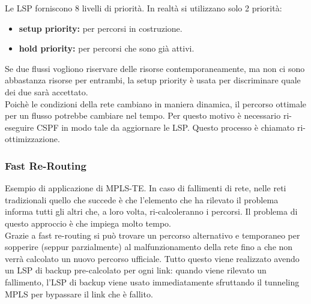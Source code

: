 \documentclass{article}
\begin{document}
Le LSP forniscono 8 livelli di priorità. In realtà si utilizzano solo 2 priorità:
\begin{itemize}
    \item \textbf{setup priority:} per percorsi in costruzione.
    \item \textbf{hold priority:} per percorsi che sono già attivi.
\end{itemize}
Se due flussi vogliono riservare delle risorse contemporaneamente, ma non ci sono abbastanza risorse per entrambi, la setup priority è usata per discriminare quale dei due sarà accettato.\\
Poichè le condizioni della rete cambiano in maniera dinamica, il percorso ottimale per un flusso potrebbe cambiare nel tempo. Per questo motivo è necessario ri-eseguire CSPF in modo tale da aggiornare le LSP. Questo processo è chiamato ri-ottimizzazione.

\subsubsection{Fast Re-Routing}
Esempio di applicazione di MPLS-TE. In caso di fallimenti di rete, nelle reti tradizionali quello che succede è che l'elemento che ha rilevato il problema informa tutti gli altri che, a loro volta, ri-calcoleranno i percorsi. Il problema di questo approccio è che impiega molto tempo.\\
Grazie a fast re-routing si può trovare un percorso alternativo e temporaneo per sopperire (seppur parzialmente) al malfunzionamento della rete fino a che non verrà calcolato un nuovo percorso ufficiale. Tutto questo viene realizzato avendo un LSP di backup pre-calcolato per ogni link: quando viene rilevato un fallimento, l'LSP di backup viene usato immediatamente sfruttando il tunneling MPLS per bypassare il link che è fallito.

\newpage
\end{document}
